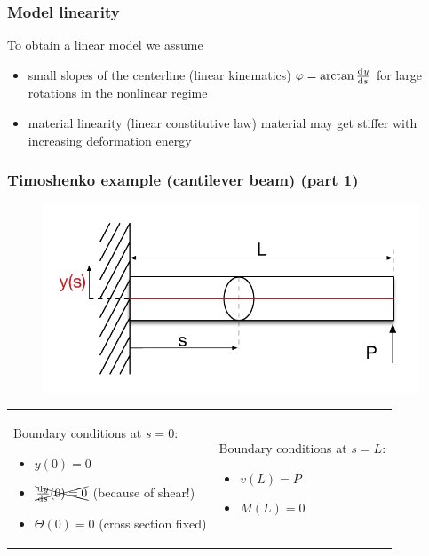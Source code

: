 \begin{frame}
  \frametitle{Model linearity}

  To obtain a linear model we assume
  \begin{itemize}
    \item small slopes of the centerline (linear kinematics) \newline
      \null \quad $\varphi = \arctan{\od{y}{s}}$ for large rotations in the nonlinear regime
    \item material linearity (linear constitutive law) \newline
      \null \quad material may get stiffer with increasing deformation energy
  \end{itemize}
\end{frame}

\begin{frame}
  \frametitle{Timoshenko example (cantilever beam) (part 1)}
  
  \begin{figure}
    \centering
    \includegraphics[width=16cm, keepaspectratio=true]{sections/traditional_beams/images/EulerCanitleverExample1part1}
  \end{figure}
  
  \begin{tabularx}{\linewidth}{XX}
    {
      Boundary conditions at $s=0$:
      \begin{itemize}
        \item $y(0) = 0$
        \item $\xcancel{\od{y}{s}(0) = 0}$ (because of shear!)
        \item $\Theta(0) = 0$ (cross section fixed)
      \end{itemize}
    } & {
      Boundary conditions at $s=L$:
      \begin{itemize}
        \item $v(L) = P$
        \item $M(L) = 0$
      \end{itemize}
    }
  \end{tabularx}
\end{frame}

